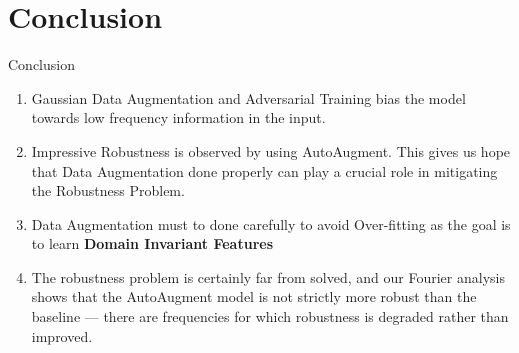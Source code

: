 \documentclass[8pt]{beamer}
\begin{document}
\section{Conclusion}
\begin{frame}{Conclusion}
\begin{enumerate}
    \item Gaussian Data Augmentation and Adversarial Training bias the model towards low frequency information in the input.
    \item Impressive Robustness is observed by using AutoAugment. This gives us hope that Data Augmentation done properly can play a crucial role in mitigating the Robustness Problem.
    \item Data Augmentation must to done carefully to avoid Over-fitting as the goal is to learn \textbf{Domain Invariant Features}
    \item The robustness problem is certainly far from solved, and our Fourier analysis shows that the AutoAugment model is not strictly more robust than the baseline — there are frequencies for which robustness is degraded rather than improved.
\end{enumerate}
\end{frame}
\end{document}
